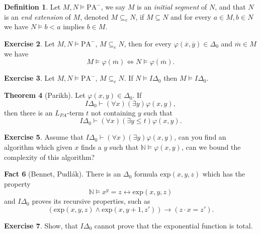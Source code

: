 \documentclass{article}
\theoremstyle{definition}
\newtheorem{thrm}{Theorem}
\newtheorem{excs}[thrm]{Exercise}
\newtheorem{fact}[thrm]{Fact}
\newtheorem{defi}[thrm]{Definition}
\newcommand{\NN}{\mathbb{N}}
\newcommand{\PA}{\text{PA}}
\begin{document}
\begin{defi}
    Let $M,N\models \PA^-$, we say $M$ is an \emph{initial segment} of $N$, and that $N$ is an \emph{end extension} of $M$, denoted $M \subseteq_e N$, if $M\subseteq N$ and for every $a\in M, b\in N$ we have $N \models b<a$ implies $b\in M$. 
\end{defi}

\begin{excs}
    Let $M,N\models \PA^{-}$, $M\subseteq_e N$, then for every $\varphi(\overline x,\overline y)\in \Delta_0$ and $\overline m \in M$ we have
    \[M\models \varphi(\overline m) \iff N \models \varphi(\overline m).\]
\end{excs}

\begin{excs}
    Let $M,N\models \PA^{-}$, $M\subseteq_e N$. If $N\models I\Delta_0$ then $M\models I\Delta_0$.
\end{excs}

\begin{thrm}[Parikh]
    Let $\varphi(x,y)\in\Delta_0$. If
    \[I\Delta_0 \vdash (\forall x)(\exists y)\varphi(x,y),\]
    then there is an $L_{PA}$-term $t$ not containing $y$ such that
    \[I\Delta_0 \vdash (\forall x)(\exists y\leq t)\varphi(x,y).\]
\end{thrm}

\begin{excs}
   Assume that $I\Delta_0\vdash (\forall x)(\exists y)\varphi(x,y)$, can you find an algorithm which given $x$ finds a $y$ such that $\NN\models\varphi(x,y)$, can we bound the complexity of this algorithm?
\end{excs}

\begin{fact}[Bennet, Pudlák]
    There is an $\Delta_0$ formula $\text{exp}(x,y,z)$ which has the property \[\NN\models  x^y = z \leftrightarrow \text{exp}(x,y,z)\] and $I\Delta_0$ proves its recursive properties, such as \[(\text{exp}(x,y,z)\land \text{exp}(x,y+1,z')) \to (z\cdot x = z').\]
\end{fact}

\begin{excs}
    Show, that $I\Delta_0$ cannot prove that the exponential function is total.
\end{excs}
\end{document}
